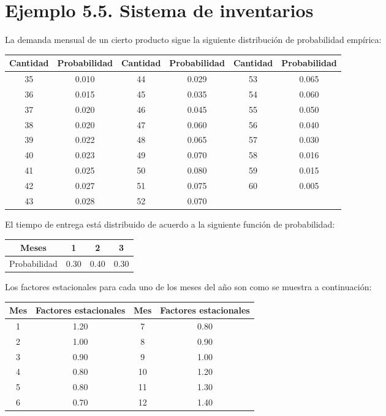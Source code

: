 \documentclass[11pt,letterpaper]{report}
\begin{document}
\section*{Ejemplo 5.5. Sistema de inventarios}

La demanda mensual de un cierto producto sigue la siguiente distribución de
probabilidad empírica:

\begin{table}[H]
\centering
\begin{tabular}{cccccc}
\toprule
Cantidad & Probabilidad & Cantidad & Probabilidad & Cantidad & Probabilidad \\
\midrule
35 & 0.010 & 44 & 0.029 & 53 & 0.065 \\
36 & 0.015 & 45 & 0.035 & 54 & 0.060 \\
37 & 0.020 & 46 & 0.045 & 55 & 0.050 \\
38 & 0.020 & 47 & 0.060 & 56 & 0.040 \\
39 & 0.022 & 48 & 0.065 & 57 & 0.030 \\
40 & 0.023 & 49 & 0.070 & 58 & 0.016 \\
41 & 0.025 & 50 & 0.080 & 59 & 0.015 \\
42 & 0.027 & 51 & 0.075 & 60 & 0.005 \\
43 & 0.028 & 52 & 0.070 &    &       \\
\bottomrule
\end{tabular}
\end{table}

El tiempo de entrega está distribuido de acuerdo a la siguiente función de
probabilidad:

\begin{table}[H]
\centering
\begin{tabular}{cccc}
\toprule
Meses & 1 & 2 & 3 \\
\midrule
Probabilidad & 0.30 & 0.40 & 0.30 \\
\bottomrule
\end{tabular}
\end{table}

Los factores estacionales para cada uno de los meses del año son como se
muestra a continuación:

\begin{table}[H]
\centering
\begin{tabular}{cccc}
\toprule
Mes & Factores estacionales & Mes & Factores estacionales \\
\midrule
1 & 1.20 & 7  & 0.80 \\
2 & 1.00 & 8  & 0.90 \\
3 & 0.90 & 9  & 1.00 \\
4 & 0.80 & 10 & 1.20 \\
5 & 0.80 & 11 & 1.30 \\
6 & 0.70 & 12 & 1.40 \\
\bottomrule
\end{tabular}
\end{table}
\end{document}
